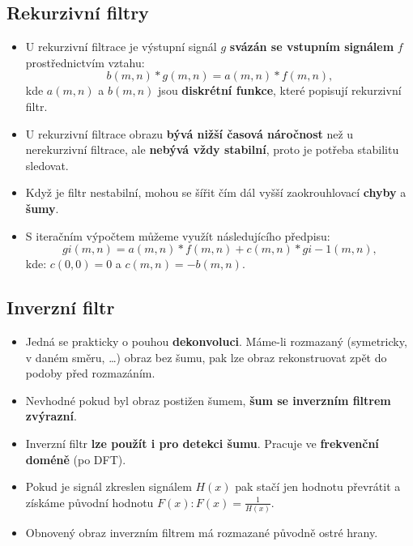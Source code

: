 \subsection{Rekurzivní filtry}
\begin{itemize}
    \item U rekurzivní filtrace je výstupní signál $ g $ \textbf{svázán se vstupním signálem} $ f $ prostřednictvím vztahu:
          \begin{equation*}
              b(m,n)*g(m,n)=a(m ,n)*f (m,n),
          \end{equation*}
          kde $ a(m,n) $ a $ b(m,n) $ jsou \textbf{diskrétní funkce}, které popisují rekurzivní filtr.
    \item U rekurzivní filtrace obrazu \textbf{bývá nižší časová náročnost} než u nerekurzivní filtrace, ale \textbf{nebývá vždy stabilní}, proto je potřeba stabilitu sledovat.
    \item Když je filtr nestabilní, mohou se šířit čím dál vyšší zaokrouhlovací \textbf{chyby} a \textbf{šumy}.
    \item S iteračním výpočtem můžeme využít následujícího předpisu:
          \begin{equation*}
              gi (m,n)=a(m,n)*f (m ,n)+c(m,n)*gi−1 (m ,n),
          \end{equation*}
          kde: $ c (0,0)=0 $ a $ c (m ,n)=−b(m ,n) $.
\end{itemize}

\subsection{Inverzní filtr}
\begin{itemize}
    \item Jedná se prakticky o pouhou \textbf{dekonvoluci}. Máme-li rozmazaný (symetricky, v daném směru, \ldots) obraz bez šumu, pak lze obraz rekonstruovat zpět do podoby před rozmazáním.
    \item Nevhodné pokud byl obraz postižen šumem, \textbf{šum se inverzním filtrem zvýrazní}.
    \item Inverzní filtr \textbf{lze použít i pro detekci šumu}. Pracuje ve \textbf{frekvenční doméně} (po DFT).
    \item Pokud je signál zkreslen signálem $ H(x) $ pak stačí jen hodnotu převrátit a získáme původní hodnotu $ F(x): F (x)= \frac{1}{H(x)} $.
    \item Obnovený obraz inverzním filtrem má rozmazané původně ostré hrany.
\end{itemize}

